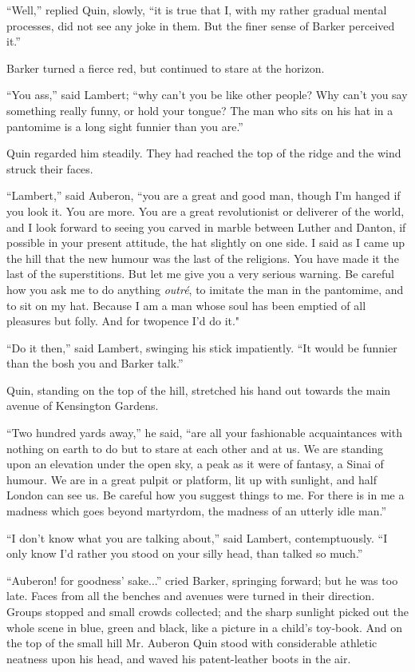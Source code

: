 \documentclass{book}
\begin{document}
“Well,” replied Quin, slowly, “it is true that I, with my rather gradual mental processes, did not see any joke in them. But the finer sense of Barker perceived it.”

Barker turned a fierce red, but continued to stare at the horizon.

“You ass,” said Lambert; “why can’t you be like other people? Why can’t you say something really funny, or hold your tongue? The man who sits on his hat in a pantomime is a long sight funnier than you are.”

Quin regarded him steadily. They had reached the top of the ridge and the wind struck their faces.

“Lambert,” said Auberon, “you are a great and good man, though I’m hanged if you look it. You are more. You are a great revolutionist or deliverer of the world, and I look forward to seeing you carved in marble between Luther and Danton, if possible in your present attitude, the hat slightly on one side. I said as I came up the hill that the new humour was the last of the religions. You have made it the last of the superstitions. But let me give you a very serious warning. Be careful how you ask me to do anything \emph{outré}, to imitate the man in the pantomime, and to sit on my hat. Because I am a man whose soul has been emptied of all pleasures but folly. And for twopence I’d do it."

“Do it then,” said Lambert, swinging his stick impatiently. “It would be funnier than the bosh you and Barker talk.”

Quin, standing on the top of the hill, stretched his hand out towards the main avenue of Kensington Gardens.

“Two hundred yards away,” he said, “are all your fashionable acquaintances with nothing on earth to do but to stare at each other and at us. We are standing upon an elevation under the open sky, a peak as it were of fantasy, a Sinai of humour. We are in a great pulpit or platform, lit up with sunlight, and half London can see us. Be careful how you suggest things to me. For there is in me a madness which goes beyond martyrdom, the madness of an utterly idle man.”

“I don’t know what you are talking about,” said Lambert, contemptuously. “I only know I’d rather you stood on your silly head, than talked so much.”

“Auberon! for goodness’ sake...” cried Barker, springing forward; but he was too late. Faces from all the benches and avenues were turned in their direction. Groups stopped and small crowds collected; and the sharp sunlight picked out the whole scene in blue, green and black, like a picture in a child’s toy-book. And on the top of the small hill Mr. Auberon Quin stood with considerable athletic neatness upon his head, and waved his patent-leather boots in the air.
\end{document}
